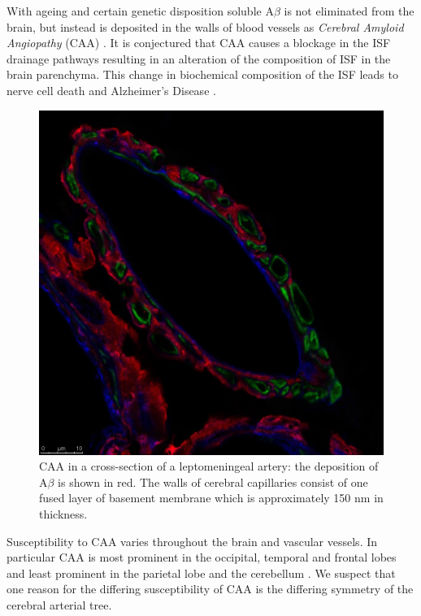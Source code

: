 \documentclass[10pt]{amsart} %
\theoremstyle{definition}
\begin{document}
With ageing and certain genetic disposition soluble A$\beta$ is not eliminated from the brain, but instead is deposited in 
the walls of blood vessels as \emph{Cerebral Amyloid Angiopathy} (CAA) \cite{wellerperi,Rox}. It is conjectured that CAA causes a blockage in 
the ISF drainage pathways resulting in an alteration of the composition of ISF in the brain parenchyma. This change in 
biochemical composition of the ISF leads to nerve cell death and Alzheimer's Disease \cite{Rox}.   
\begin{figure}[h] 
\centering 
\includegraphics[scale=0.15]{abeta.jpg} \caption{CAA in a cross-section of a leptomeningeal artery: the deposition of A$\beta$ is shown in red.  The walls of cerebral capillaries consist of one fused layer of basement membrane which is approximately 150 nm in thickness.}\label{figy:2}
\end{figure}

Susceptibility to CAA varies throughout the brain and vascular vessels.  In particular  
CAA  is most prominent in the occipital, temporal and frontal lobes and least prominent in the parietal lobe and the cerebellum %
\cite{Preston}. We suspect that one reason for the differing susceptibility of CAA is the differing symmetry of the cerebral 
arterial tree.  
\end{document}
